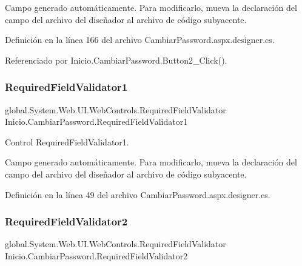 Campo generado automáticamente. Para modificarlo, mueva la declaración del campo del archivo del diseñador al archivo de código subyacente. 

Definición en la línea 166 del archivo Cambiar\+Password.\+aspx.\+designer.\+cs.



Referenciado por Inicio.\+Cambiar\+Password.\+Button2\+\_\+\+Click().

\mbox{\label{classInicio_1_1CambiarPassword_a97691c6df6a8a92e71fe388ec90bd635}} 
\subsubsection{\texorpdfstring{RequiredFieldValidator1}{RequiredFieldValidator1}}
{\footnotesize\ttfamily global.\+System.\+Web.\+U\+I.\+Web\+Controls.\+Required\+Field\+Validator Inicio.\+Cambiar\+Password.\+Required\+Field\+Validator1\hspace{0.3cm}{\ttfamily [protected]}}



Control Required\+Field\+Validator1. 

Campo generado automáticamente. Para modificarlo, mueva la declaración del campo del archivo del diseñador al archivo de código subyacente. 

Definición en la línea 49 del archivo Cambiar\+Password.\+aspx.\+designer.\+cs.

\mbox{\label{classInicio_1_1CambiarPassword_a955b645fae496e6d030ac5da64663fc7}} 
\subsubsection{\texorpdfstring{RequiredFieldValidator2}{RequiredFieldValidator2}}
{\footnotesize\ttfamily global.\+System.\+Web.\+U\+I.\+Web\+Controls.\+Required\+Field\+Validator Inicio.\+Cambiar\+Password.\+Required\+Field\+Validator2\hspace{0.3cm}{\ttfamily [protected]}}



